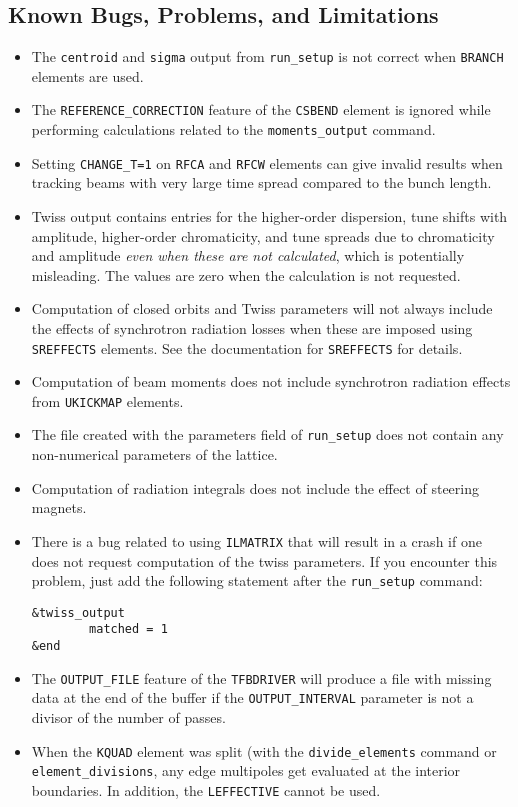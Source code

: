 \documentclass[11pt]{article}
\begin{document}
\subsection{Known Bugs, Problems, and Limitations}
\begin{itemize}
\item The \verb|centroid| and \verb|sigma| output from \verb|run_setup| is not correct when \verb|BRANCH| elements
  are used.
\item The \verb|REFERENCE_CORRECTION| feature of the \verb|CSBEND| element is ignored while performing calculations related
  to the \verb|moments_output| command.
\item Setting \verb|CHANGE_T=1| on \verb|RFCA| and \verb|RFCW| elements can give invalid results when tracking beams with very 
  large time spread compared to the bunch length.
\item Twiss output contains entries for the higher-order dispersion, tune shifts with amplitude, higher-order chromaticity, and tune spreads
  due to chromaticity and amplitude {\em even when these are not calculated}, which is potentially
  misleading.   The values are zero when the calculation is not requested.
\item Computation of closed orbits and Twiss parameters will not always include the effects of synchrotron
  radiation losses when these are imposed using {\tt SREFFECTS} elements.  See
  the documentation for {\tt SREFFECTS} for details.
\item Computation of beam moments does not include synchrotron radiation effects from \verb|UKICKMAP| elements.
\item The file created with the parameters field of \verb|run_setup| does not contain
  any non-numerical parameters of the lattice.
\item Computation of radiation integrals does not include the effect of steering magnets.
\item There is a bug related to using {\tt ILMATRIX} that will result in a crash
  if one does not request computation of the twiss parameters. If you encounter this
  problem, just add the following statement after the \verb|run_setup| command:
\begin{verbatim}
&twiss_output
        matched = 1
&end
\end{verbatim}
\item The \verb|OUTPUT_FILE| feature of the \verb|TFBDRIVER| will produce a file with missing data at the end of
  the buffer if the \verb|OUTPUT_INTERVAL| parameter is not a divisor of the number of passes.
\item When the \verb|KQUAD| element was split (with the \verb|divide_elements| command or
  \verb|element_divisions|, any edge multipoles get evaluated at the interior boundaries. In addition, the
  \verb|LEFFECTIVE| cannot be used.
\end{itemize}
\end{document}
